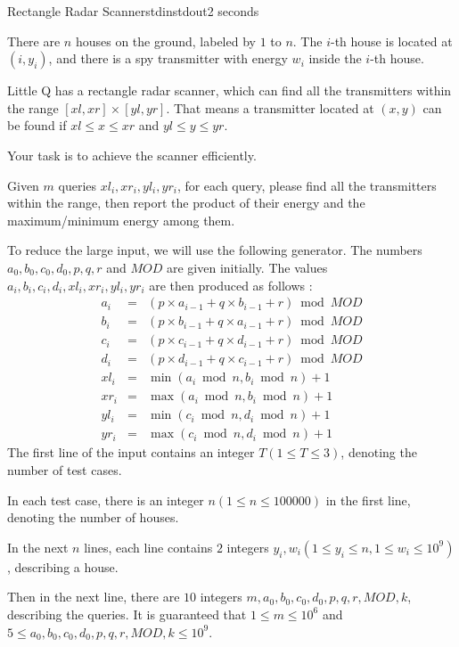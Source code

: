 \documentclass[11pt,a4paper,oneside]{article}
\newcommand{\timeLimit}{2 seconds}
\begin{document}
\begin{problem}{Rectangle Radar Scanner}{stdin}{stdout}{\timeLimit}

There are $n$ houses on the ground, labeled by $1$ to $n$. The $i$-th house is located at $(i,y_i)$, and there is a spy transmitter with energy $w_i$ inside the $i$-th house.\par
Little Q has a rectangle radar scanner, which can find all the transmitters within the range $[xl,xr]\times[yl,yr]$. That means a transmitter located at $(x,y)$ can be found if $xl\leq x\leq xr$ and $yl\leq y\leq yr$.\par
Your task is to achieve the scanner efficiently.\par
Given $m$ queries $xl_i,xr_i,yl_i,yr_i$, for each query, please find all the transmitters within the range, then report the product of their energy and the maximum/minimum energy among them.\par
To reduce the large input, we will use the following generator. The numbers $a_0,b_0,c_0,d_0,p,q,r$ and $MOD$ are given initially. The values $a_i,b_i,c_i,d_i,xl_i,xr_i,yl_i,yr_i$ are then produced as follows :
\begin{eqnarray*}
a_i&=&(p\times a_{i-1}+q\times b_{i-1}+r)\bmod MOD\\
b_i&=&(p\times b_{i-1}+q\times a_{i-1}+r)\bmod MOD\\
c_i&=&(p\times c_{i-1}+q\times d_{i-1}+r)\bmod MOD\\
d_i&=&(p\times d_{i-1}+q\times c_{i-1}+r)\bmod MOD\\
xl_i&=&\min(a_i\bmod n,b_i\bmod n)+1\\
xr_i&=&\max(a_i\bmod n,b_i\bmod n)+1\\
yl_i&=&\min(c_i\bmod n,d_i\bmod n)+1\\
yr_i&=&\max(c_i\bmod n,d_i\bmod n)+1
\end{eqnarray*}
\InputFile
The first line of the input contains an integer $T(1\leq T\leq3)$, denoting the number of test cases.\par
In each test case, there is an integer $n(1\leq n\leq 100000)$ in the first line, denoting the number of houses.\par
In the next $n$ lines, each line contains $2$ integers $y_i,w_i(1\leq y_i\leq n,1\leq w_i\leq 10^9)$, describing a house.\par
Then in the next line, there are $10$ integers $m,a_0,b_0,c_0,d_0,p,q,r,MOD,k$, describing the queries. It is guaranteed that $1\leq m\leq 10^6$ and $5\leq a_0,b_0,c_0,d_0,p,q,r,MOD,k\leq 10^9$.


\end{problem}
\end{document}
